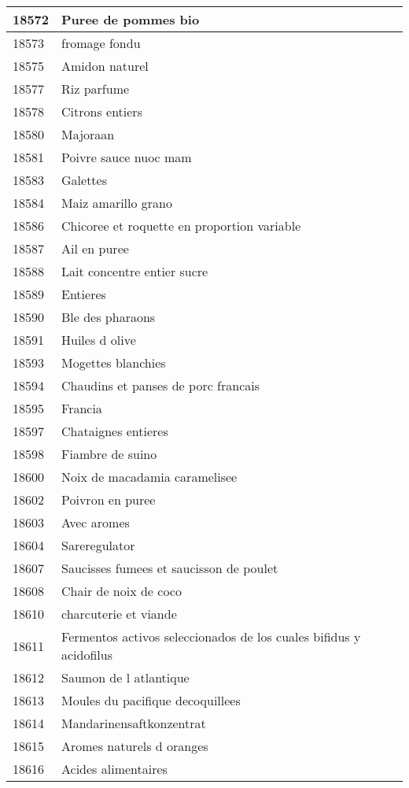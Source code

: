 \begin{longtable}{|l|l|}
18572 & Puree de pommes bio \\ \hline 
18573 &  fromage fondu \\ \hline 
18575 & Amidon naturel \\ \hline 
18577 & Riz parfume \\ \hline 
18578 & Citrons entiers \\ \hline 
18580 & Majoraan \\ \hline 
18581 & Poivre sauce nuoc mam \\ \hline 
18583 & Galettes \\ \hline 
18584 & Maiz amarillo grano \\ \hline 
18586 & Chicoree et roquette en proportion variable \\ \hline 
18587 & Ail en puree \\ \hline 
18588 & Lait concentre entier sucre \\ \hline 
18589 & Entieres \\ \hline 
18590 & Ble des pharaons \\ \hline 
18591 & Huiles d olive \\ \hline 
18593 & Mogettes blanchies \\ \hline 
18594 & Chaudins et panses de porc francais \\ \hline 
18595 & Francia \\ \hline 
18597 & Chataignes entieres \\ \hline 
18598 & Fiambre de suino \\ \hline 
18600 & Noix de macadamia caramelisee \\ \hline 
18602 & Poivron en puree \\ \hline 
18603 & Avec aromes \\ \hline 
18604 & Sareregulator \\ \hline 
18607 & Saucisses fumees et saucisson de poulet \\ \hline 
18608 & Chair de noix de coco \\ \hline 
18610 & charcuterie et viande \\ \hline 
18611 & Fermentos activos seleccionados de los cuales bifidus y acidofilus \\ \hline 
18612 & Saumon de l atlantique \\ \hline 
18613 & Moules du pacifique decoquillees \\ \hline 
18614 & Mandarinensaftkonzentrat \\ \hline 
18615 & Aromes naturels d oranges \\ \hline 
18616 & Acides alimentaires \\ \hline 

\end{longtable}
